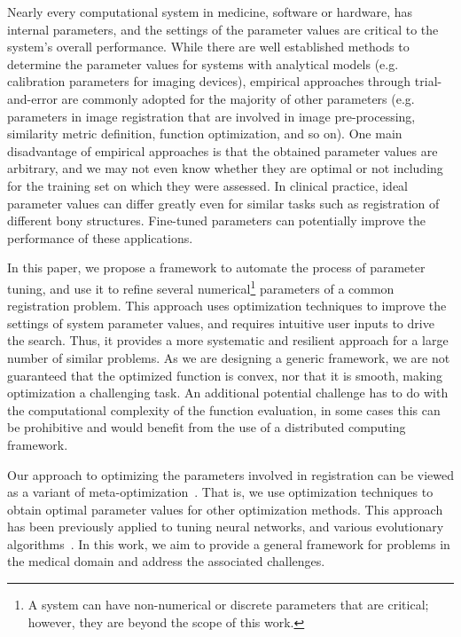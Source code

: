 \documentclass[]{spie}  %
\begin{document}
Nearly every computational system in medicine, software or hardware, has internal parameters, and the settings of the parameter values are critical to the system's overall performance. While there are well established methods to determine the parameter values for systems with analytical models (e.g. calibration parameters for imaging devices), empirical approaches through trial-and-error are commonly adopted for the majority of other parameters (e.g. parameters in image registration that are involved in image pre-processing, similarity metric definition, function optimization, and so on). One main disadvantage of empirical approaches is that the obtained parameter values are arbitrary, and we may not even know whether they are optimal or not including for the training set on
which they were assessed. In clinical practice, ideal parameter values can differ greatly even for similar tasks such as registration of different bony structures. Fine-tuned parameters can potentially improve the performance of these applications.

In this paper, we propose a framework to automate the process of parameter tuning, and use it to refine several numerical\footnote{A system can have non-numerical or discrete parameters that are critical; however, they are beyond the scope of this work.} parameters of a common registration problem. This approach uses optimization techniques to improve the settings of system parameter values, and requires intuitive user inputs to drive the search. Thus, it provides a more systematic and resilient approach for a large number of similar problems.
As we are designing a generic framework, we are not guaranteed that the optimized function is convex, nor that it
is smooth, making optimization a challenging task. An additional potential challenge has to do with the computational complexity of the function evaluation, in some cases this can be prohibitive and would benefit from the use of a distributed computing framework.

Our approach to optimizing the parameters involved in registration can be viewed as a variant of meta-optimization~\cite{metaopt}. That is, we use optimization techniques to obtain optimal parameter values for other optimization methods. This approach has been previously applied to tuning neural networks, and various evolutionary algorithms~\cite{smit09:ece}. In this work, we aim to provide a general framework for problems in the medical domain and address the associated challenges.

\end{document}
